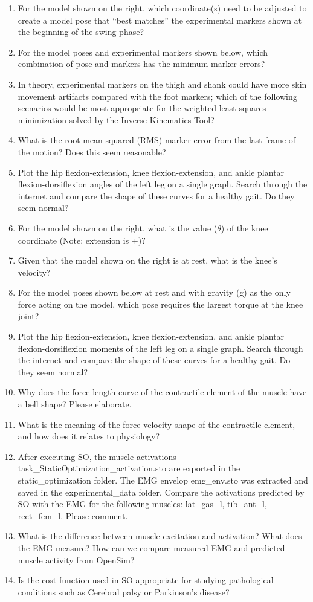 \documentclass[11pt]{article}
\begin{document}
\begin{enumerate}
    \item For the model shown on the right, which coordinate(s) need to be adjusted to create a model pose that “best matches” the experimental markers shown at the beginning of the swing phase?
    \item For the model poses and experimental markers shown below, which combination of pose and markers has the minimum marker errors?
    \item In theory, experimental markers on the thigh and shank could have more skin movement artifacts compared with the foot markers; which of the following scenarios would be most appropriate for the weighted least squares minimization solved by the Inverse Kinematics Tool?
    \item What is the root-mean-squared (RMS) marker error from the last frame of the motion? Does this seem reasonable?
    \item Plot the hip flexion-extension, knee flexion-extension, and ankle plantar flexion-dorsiflexion angles of the left leg on a single graph. Search through the internet and compare the shape of these curves for a healthy gait. Do they seem normal?
    \item For the model shown on the right, what is the value ($\theta$) of the knee coordinate (Note: extension is +)?
    \item Given that the model shown on the right is at rest, what is the knee's velocity?
    \item For the model poses shown below at rest and with gravity (g) as the only force acting on the model, which pose requires the largest torque at the knee joint?
    \item Plot the hip flexion-extension, knee flexion-extension, and ankle plantar flexion-dorsiflexion moments of the left leg on a single graph. Search through the internet and compare the shape of these curves for a healthy gait. Do they seem normal?
    \item Why does the force-length curve of the contractile element of the muscle have a bell shape? Please elaborate. 
    \item What is the meaning of the force-velocity shape of the contractile element, and how does it relates to physiology? 
    \item After executing SO, the muscle activations task\_StaticOptimization\_activation.sto are exported in the static\_optimization folder. The EMG envelop emg\_env.sto was extracted and saved in the experimental\_data folder. Compare the activations predicted by SO with the EMG for the following muscles: lat\_gas\_l, tib\_ant\_l, rect\_fem\_l. Please comment.
    \item What is the difference between muscle excitation and activation? What does the EMG measure? How can we compare measured EMG and predicted muscle activity from OpenSim?
    \item Is the cost function used in SO appropriate for studying pathological conditions such as Cerebral palsy or Parkinson’s disease?
\end{enumerate}
\end{document}
